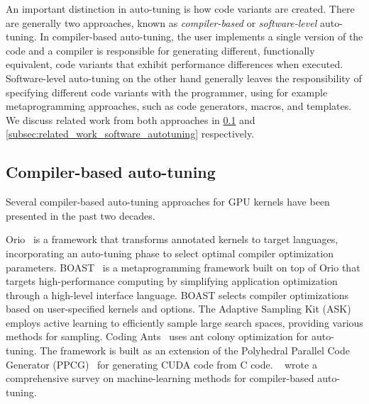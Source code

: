 An important distinction in auto-tuning is how code variants are created. There are generally two approaches, known as {\em compiler-based} or {\em software-level} auto-tuning. In compiler-based auto-tuning, the user implements a single version of the code and a compiler is responsible for generating different, functionally equivalent, code variants that exhibit performance differences when executed. Software-level auto-tuning on the other hand generally leaves the responsibility of specifying different code variants with the programmer, using for example metaprogramming approaches, such as code generators, macros, and templates. 
We discuss related work from both approaches in \cref{subsec:related_work_compiler_autotuning} and \cref{subsec:related_work_software_autotuning} respectively. 

\subsection{Compiler-based auto-tuning} \label{subsec:related_work_compiler_autotuning}
Several compiler-based auto-tuning approaches for GPU kernels have been presented in the past two decades.

Orio~\cite{Orio} is a framework that transforms annotated kernels to target languages, incorporating an auto-tuning phase to select optimal compiler optimization parameters. 
BOAST~\cite{BOAST} is a metaprogramming framework built on top of Orio that targets high-performance computing by simplifying application optimization through a high-level interface language. BOAST selects compiler optimizations based on user-specified kernels and options.
%
The Adaptive Sampling Kit (ASK)~\cite{ASK} employs active learning to efficiently sample large search spaces, providing various methods for sampling.
%
Coding Ants~\cite{CodingAnts} uses ant colony optimization for auto-tuning. 
The framework is built as an extension of the Polyhedral Parallel Code Generator (PPCG)~\cite{PPCG} for generating CUDA code from C code. %
\citeauthor{ashouri2018survey}~\cite{ashouri2018survey} wrote a comprehensive survey on machine-learning methods for compiler-based auto-tuning. 

